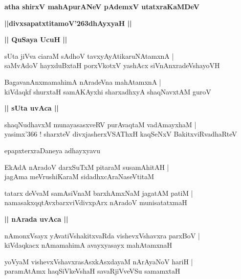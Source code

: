 \documentclass[twoside,12pt,openright]{book}
\def\S{\char'263}
\newcounter{shloka}[chapter]
\def\uvaca#1{\centerline{{\large\textbf{#1}}}}
\begin{document}
\begin{center}
{\LARGE\bfseries atha shirxV mahApurANeV pAdemxV utatxraKaMDeV}
\end{center}

\begin{center}
{\LARGE\bfseries ||divxsapatxtitamoV\S dhAyxyaH || }
\end{center}

\uvaca{|| QuSaya UcuH ||}

\begin{shloka}%
sUta jiVva ciaraM sAdhoV tavxyAyAtikaruNAtamxnA |\\
saMvAdoV hayxduBxtaH porxVkotxV yashAcx siVnAnxradeVshayoVH 
\end{shloka}

\begin{shloka}%
BagavanAnxmamahimA nAradeVna mahAtamxnA |\\
kiVdaqkf shurxtaH samAKAyxhi sharxadhxyA shaqNavxtAM guroV 
\end{shloka}

\uvaca{|| sUta uvAca ||}

\begin{shloka}%
shaqNudhavxM munayasasxveRV purAvaqtaM vadAmayxhaM |\\
yasimx\char'366 ! sharxteV divxjasherxVSAThxH kaqSeNxV BakitxviRvadhaRteV 
\end{shloka}

\begin{center}
epapxterxraDaneya adhayxyavu
\end{center}

\begin{shloka}%
EkAdA nAradoV darxSuTxM pitaraM susamAhitAH |\\
jagAma meVrushiKaraM sidadhxcAraNaseVtitaM 
\end{shloka}

\begin{shloka}%
tatarx deVvaM samAsiVnaM barxhAmxNaM jagatAM patiM |\\
namasakxqqtAvxbarxviVdivxpArx nAradoV munisatatxmaH
\end{shloka}

\uvaca{|| nArada uvAca ||}

\begin{shloka}%
nAmonxVsayx yAvatiVshakitxvaRda vishevxVshavxra parxBoV |\\
kiVdaqkacx nAmamahimA avayxyasayx mahAtamxnaH
\end{shloka}

\begin{shloka}%
yoVyaM vishevxVshavxrasAsxkAsxdayaM nArAyaNoV hariH |\\
paramAtAmx haqSiVkeVshaH savaRjiVveVSu samamxtaH 
\end{shloka}
\end{document}
